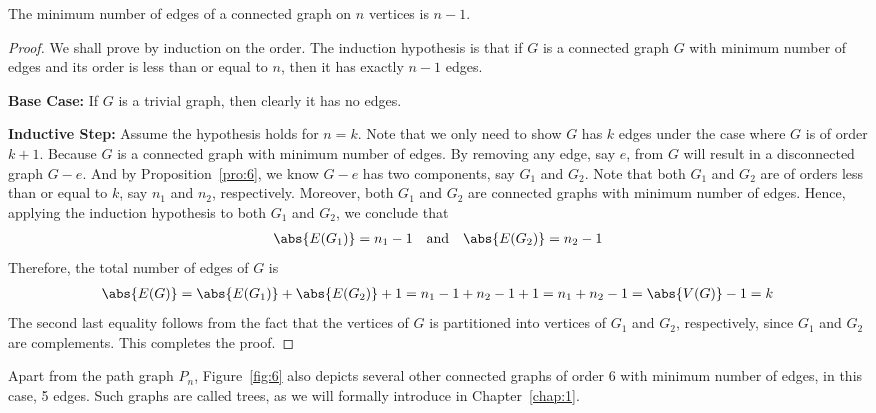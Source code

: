 \documentclass[thmcnt=section, 12pt, color=cyan]{my-elegantbook}
\begin{document}
\begin{proposition} \label{pro:8}
	The minimum number of edges of 
	a connected graph on $n$ vertices
	is $n-1$.
\end{proposition}

\begin{proof}
	We shall prove by induction on the order.
	The induction hypothesis is that
	if $G$ is a connected graph $G$ with minimum number of edges
	and its order is less than or equal to $n$,
	then it has exactly $n-1$ edges.

	\noindent\textbf{Base Case:} 
	If $G$ is a trivial graph, 
	then clearly it has no edges.

	\noindent\textbf{Inductive Step:}
	Assume the hypothesis holds for $n = k$.
	Note that we only need to show 
	$G$ has $k$ edges under the case where 
	$G$ is of order $k+1$.
	Because $G$ is a connected graph with minimum number
	of edges.
	By removing any edge, say $e$, from $G$ 
	will result in a disconnected graph $G-e$.
	And by Proposition~\ref{pro:6}, 
	we know $G-e$ has two components, say $G_1$ and $G_2$.
	Note that both $G_1$ and $G_2$ are of 
	orders less than or equal to $k$, 
	say $n_1$ and $n_2$, respectively.
	Moreover, both $G_1$ and $G_2$ are connected graphs
	with minimum number of edges.
	Hence, applying the induction hypothesis 
	to both $G_1$ and $G_2$,
	we conclude that 
	\begin{align*}
		\abs{E(G_1)} = n_1 - 1 
		\quad \text{and} \quad 
		\abs{E(G_2)} = n_2 - 1
	\end{align*}
	Therefore, the total number of edges of $G$ is 
	\begin{align*}
		\abs{E(G)} = \abs{E(G_1)} + \abs{E(G_2)} + 1 
		= n_1 - 1 + n_2 - 1 + 1 
		= n_1 + n_2 - 1
		= \abs{V(G)} - 1
		= k
	\end{align*}
	The second last equality follows from the fact that 
	the vertices of $G$ is partitioned into 
	vertices of $G_1$ and $G_2$, respectively,
	since $G_1$ and $G_2$ are complements.
	This completes the proof.
\end{proof}

Apart from the path graph $P_n$, 
Figure~\ref{fig:6} also depicts several other 
connected graphs of order 6 
with minimum number of edges, 
in this case, 5 edges.
Such graphs are called trees, 
as we will formally introduce in Chapter~\ref{chap:1}.
\end{document}
